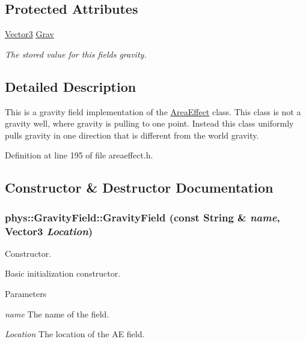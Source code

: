 \subsection*{Protected Attributes}
\begin{DoxyCompactItemize}
\item 
\hypertarget{classphys_1_1GravityField_a14084e696d0848db88b4a91413245849}{
\hyperlink{classphys_1_1Vector3}{Vector3} \hyperlink{classphys_1_1GravityField_a14084e696d0848db88b4a91413245849}{Grav}}
\label{d4/d8a/classphys_1_1GravityField_a14084e696d0848db88b4a91413245849}

\begin{DoxyCompactList}\small\item\em The stored value for this fields gravity. \item\end{DoxyCompactList}\end{DoxyCompactItemize}


\subsection{Detailed Description}
This is a gravity field implementation of the \hyperlink{classphys_1_1AreaEffect}{AreaEffect} class. This class is not a gravity well, where gravity is pulling to one point. Instead this class uniformly pulls gravity in one direction that is different from the world gravity. 

Definition at line 195 of file areaeffect.h.



\subsection{Constructor \& Destructor Documentation}
\hypertarget{classphys_1_1GravityField_a9093176e954b4c631d0757a553971cfd}{
\subsubsection[{GravityField}]{\setlength{\rightskip}{0pt plus 5cm}phys::GravityField::GravityField (const {\bf String} \& {\em name}, \/  {\bf Vector3} {\em Location})}}
\label{d4/d8a/classphys_1_1GravityField_a9093176e954b4c631d0757a553971cfd}


Constructor. 

Basic initialization constructor. 
\begin{DoxyParams}{Parameters}
\item[{\em name}]The name of the field. \item[{\em Location}]The location of the AE field. \end{DoxyParams}


